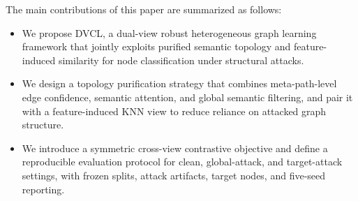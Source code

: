 The main contributions of this paper are summarized as follows:
\begin{itemize}
    \item We propose DVCL, a dual-view robust heterogeneous graph learning framework that jointly exploits purified semantic topology and feature-induced similarity for node classification under structural attacks.
    \item We design a topology purification strategy that combines meta-path-level edge confidence, semantic attention, and global semantic filtering, and pair it with a feature-induced KNN view to reduce reliance on attacked graph structure.
    \item We introduce a symmetric cross-view contrastive objective and define a reproducible evaluation protocol for clean, global-attack, and target-attack settings, with frozen splits, attack artifacts, target nodes, and five-seed reporting.
\end{itemize}

